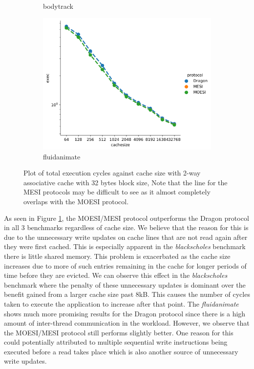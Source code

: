 \documentclass[nonacm,acmsmall,screen,11pt]{acmart}
\begin{document}
\begin{figure}[htb!]
\begin{subfigure}{0.32\textwidth}
    \caption{bodytrack}
  \end{subfigure}
  \begin{subfigure}{0.32\textwidth}
    \includegraphics[width=\columnwidth]{cachesize-fluidanimate}
    \caption{fluidanimate}
  \end{subfigure}
  \caption{Plot of total execution cycles against cache size with 2-way associative cache with 32 bytes block size, Note that the line for the MESI protocols may be difficult to see as it almost completely overlaps with the MOESI protocol.}
  \label{fig:cachesize}
\end{figure}
As seen in Figure \ref{fig:cachesize}, the MOESI/MESI protocol outperforms the Dragon protocol in all 3 benchmarks regardless of cache size. We believe that the reason for this is due to the unnecessary write updates on cache lines that are not read again after they were first cached. This is especially apparent in the \textit{blackscholes} benchmark there is little shared memory. This problem is exacerbated as the cache size increases due to more of such entries remaining in the cache for longer periods of time before they are evicted. We can observe this effect in the \textit{blackscholes} benchmark where the penalty of these unnecessary updates is dominant over the benefit gained from a larger cache size past 8kB. This causes the number of cycles taken to execute the application to increase after that point.
The \textit{fluidanimate} shows much more promising results for the Dragon protocol since there is a high amount of inter-thread communication in the workload. However, we observe that the MOESI/MESI protocol still performs slightly better. One reason for this could potentially attributed to multiple sequential write instructions being executed before a read takes place which is also another source of unnecessary write updates.
\end{document}
